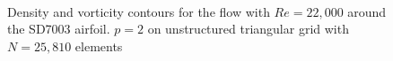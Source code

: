 \begin{figure}[htbp]
\centering
{}
\\

\caption{Density and vorticity contours for the flow with $Re = 22,000$ around the SD7003 airfoil. $p=2$ on unstructured triangular grid with $N = 25,810$ elements}
\label{sdairfoilre22k}
\end{figure}

